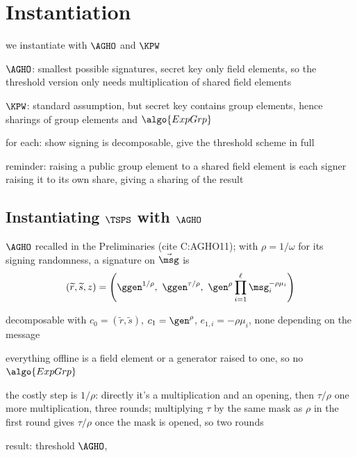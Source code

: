 \section{Instantiation}\label{sec:tsps-instantiation}

\begin{outline}
  \item we instantiate with $\AGHO$ and $\KPW$
  \item $\AGHO$: smallest possible signatures, secret key only field elements, so
the threshold version only needs multiplication of shared field elements
  \item $\KPW$: standard assumption, but secret key contains group elements,
hence sharings of group elements and $\algo{ExpGrp}$
  \item for each: show signing is decomposable, give the threshold scheme in full
  \item reminder: raising a public group element to a shared field element is
each signer raising it to its own share, giving a sharing of the result
\end{outline}

\subsection{Instantiating $\TSPS$ with $\AGHO$}\label{sec:tsps-abe}

\begin{outline}
  \item $\AGHO$ recalled in the Preliminaries (cite C:AGHO11); with $\rho =
1/\omega$ for its signing randomness, a signature on $\vec{\msg}$ is
      \begin{equation*}
	(\widetilde{r}, \widetilde{s}, z) = \left(\ggen^{1/\rho}, \
\ggen^{\tau/\rho}, \ \gen^{\rho} \prod_{i=1}^{\ell} \msg_i^{-\rho\mu_i}\right)
      \end{equation*}
  \item decomposable with $c_0 = (\widetilde{r}, \widetilde{s})$, $c_1 =
\gen^{\rho}$, $e_{1,i} = -\rho\mu_i$, none depending on the message
  \item everything offline is a field element or a generator raised to one, so
no $\algo{ExpGrp}$
  \item the costly step is $1/\rho$: directly it's a multiplication and an
opening, then $\tau/\rho$ one more multiplication, three rounds; multiplying
$\tau$ by the same mask as $\rho$ in the first round gives $\tau/\rho$ once the
mask is opened, so two rounds
  \item result: threshold $\AGHO$, 
\end{outline}

